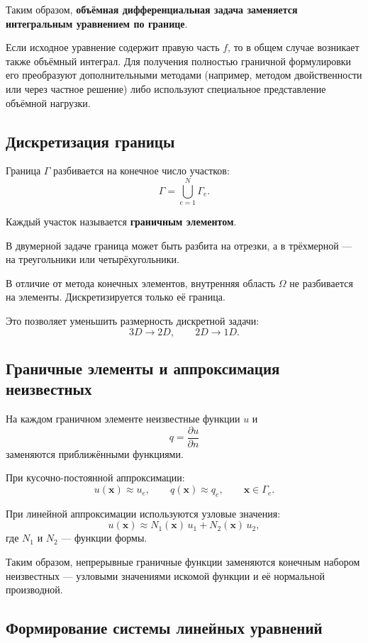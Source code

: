 Таким образом, \textbf{объёмная дифференциальная задача заменяется интегральным уравнением по границе}.

Если исходное уравнение содержит правую часть $f$, то в общем случае возникает также объёмный интеграл. Для получения полностью граничной формулировки его преобразуют дополнительными методами (например, методом двойственности или через частное решение) либо используют специальное представление объёмной нагрузки.

\subsection{Дискретизация границы}

Граница $\Gamma$ разбивается на конечное число участков:
$$
\Gamma = \bigcup_{e=1}^{N}\Gamma_e.
$$

Каждый участок называется \textbf{граничным элементом}.

В двумерной задаче граница может быть разбита на отрезки, а в трёхмерной --- на треугольники или четырёхугольники.

В отличие от метода конечных элементов, внутренняя область $\Omega$ не разбивается на элементы. Дискретизируется только её граница.

Это позволяет уменьшить размерность дискретной задачи:
$$
3D \rightarrow 2D,
\qquad
2D \rightarrow 1D.
$$

\subsection{Граничные элементы и аппроксимация неизвестных}

На каждом граничном элементе неизвестные функции $u$ и
$$
q = \frac{\partial u}{\partial n}
$$
заменяются приближёнными функциями.

При кусочно-постоянной аппроксимации:
$$
u(\mathbf{x}) \approx u_e,
\qquad
q(\mathbf{x}) \approx q_e,
\qquad
\mathbf{x}\in\Gamma_e.
$$

При линейной аппроксимации используются узловые значения:
$$
u(\mathbf{x})
\approx
N_1(\mathbf{x})\,u_1
+
N_2(\mathbf{x})\,u_2,
$$
где $N_1$ и $N_2$ --- функции формы.

Таким образом, непрерывные граничные функции заменяются конечным набором неизвестных --- узловыми значениями искомой функции и её нормальной производной.

\subsection{Формирование системы линейных уравнений}

